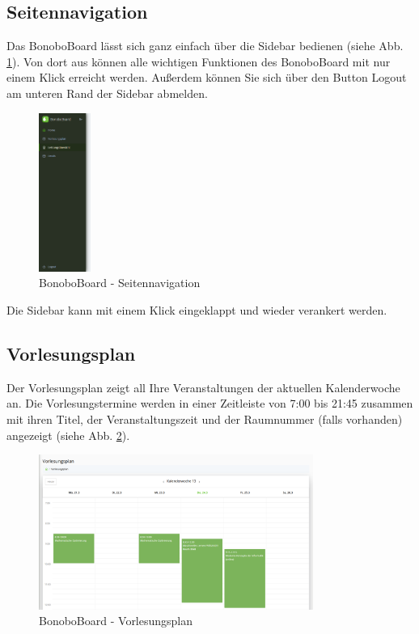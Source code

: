 \documentclass[a4paper,11pt]{scrartcl}
\begin{document}
\subsection{Seitennavigation}
Das BonoboBoard lässt sich ganz einfach über die Sidebar bedienen (siehe Abb. \ref{img:sidebar}). Von dort aus können alle wichtigen Funktionen des BonoboBoard mit nur einem Klick erreicht werden. Außerdem können Sie sich über den Button \frqq{}Logout\flqq{} am unteren Rand der Sidebar abmelden.

\begin{figure}[H]
	\begin{center}
		\includegraphics[width=0.15\textwidth]{sidebar}
		\caption{BonoboBoard - Seitennavigation}
		\label{img:sidebar}
	\end{center}
\end{figure}

\noindent Die Sidebar kann mit einem Klick eingeklappt und wieder verankert werden.

\subsection{Vorlesungsplan}
Der Vorlesungsplan zeigt all Ihre Veranstaltungen der aktuellen Kalenderwoche an. Die Vorlesungstermine werden in einer Zeitleiste von 7:00 bis 21:45 zusammen mit ihren Titel, der Veranstaltungszeit und der Raumnummer (falls vorhanden) angezeigt (siehe Abb. \ref{img:lecture}). 

\begin{figure}[H]
	\begin{center}
		\includegraphics[width=0.8\textwidth]{lecture_plan}
		\caption{BonoboBoard - Vorlesungsplan}
		\label{img:lecture}
	\end{center}
\end{figure}
\end{document}
